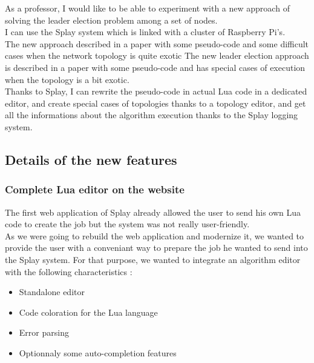 \documentclass{eplmastersthesis}
\begin{document}
          As a professor, I would like to be able to experiment with a new
          approach of solving the leader election problem among a set of
          nodes.\\
          I can use the Splay system which is linked with a cluster of
          Raspberry Pi's.\\
          The new approach described in a paper with some pseudo-code and some difficult
          cases when the network topology is quite exotic
          The new leader election approach is described in a paper with some
          pseudo-code and has special cases of execution when the topology is
          a bit exotic.\\
          Thanks to Splay, I can rewrite the pseudo-code in actual Lua code
          in a dedicated editor, and create special cases of topologies
          thanks to a topology editor, and get all the informations about
          the algorithm execution thanks to the Splay logging system.



      \subsection{Details of the new features}

        \subsubsection{Complete Lua editor on the website}

          The first web application of Splay already allowed the user to send
          his own Lua code to create the job but the system was not really
          user-friendly.\\

          As we were going to rebuild the web application and modernize it,
          we wanted to provide the user with a conveniant way to prepare
          the job he wanted to send into the Splay system. For that purpose,
          we wanted to integrate an algorithm editor with the following
          characteristics :

          \begin{itemize}
            \item Standalone editor
            \item Code coloration for the Lua language
            \item Error parsing
            \item Optionnaly some auto-completion features
          \end{itemize}
\end{document}
